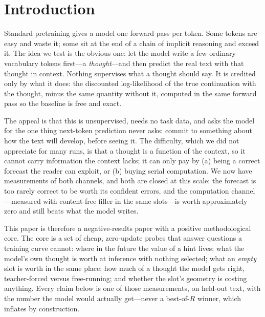 \documentclass{article} %
\begin{document}
\section{Introduction}

Standard pretraining gives a model one forward pass per token. Some tokens are easy and waste it; some sit at the end of a chain of implicit reasoning and exceed it. The idea we test is the obvious one: let the model write a few ordinary vocabulary tokens first---a \emph{thought}---and then predict the real text with that thought in context. Nothing supervises what a thought should say. It is credited only by what it does: the discounted log-likelihood of the true continuation with the thought, minus the same quantity without it, computed in the same forward pass so the baseline is free and exact.

The appeal is that this is unsupervised, needs no task data, and asks the model for the one thing next-token prediction never asks: commit to something about how the text will develop, before seeing it. The difficulty, which we did not appreciate for many runs, is that a thought is a function of the context, so it cannot carry information the context lacks; it can only pay by (a) being a correct forecast the reader can exploit, or (b) buying serial computation. We now have measurements of both channels, and both are closed at this scale: the forecast is too rarely correct to be worth its confident errors, and the computation channel---measured with content-free filler in the same slots---is worth approximately zero and still beats what the model writes.

This paper is therefore a negative-results paper with a positive methodological core. The core is a set of cheap, zero-update probes that answer questions a training curve cannot: where in the future the value of a hint lives; what the model's own thought is worth at inference with nothing selected; what an \emph{empty} slot is worth in the same place; how much of a thought the model gets right, teacher-forced versus free-running; and whether the slot's geometry is costing anything. Every claim below is one of those measurements, on held-out text, with the number the model would actually get---never a best-of-$R$ winner, which inflates by construction.
\end{document}
